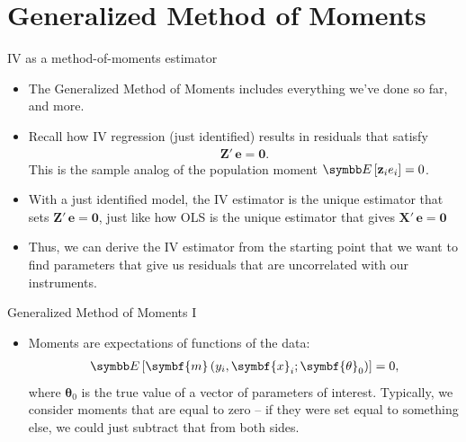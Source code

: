 \documentclass[aspectratio=169,11pt]{beamer}
\begin{document}
\section{Generalized Method of Moments}
	

\begin{frame}{IV as a method-of-moments estimator}
\begin{itemize}
	\item The Generalized Method of Moments includes everything we've
	done so far, and more.
	
	\item Recall how IV regression (just identified) results in residuals that satisfy
	\begin{align*}
		\symbf{Z}'\, \symbf{e}  = \symbf{0}.
	\end{align*}
	This is the sample analog of the population moment $\E\left[ {\bf z}_i e_i \right]=0$.
	
	\medskip
	\item With a just identified model, the IV estimator is the unique estimator that sets 
	$\symbf{Z'\, e} = \symbf{0} $, just like how OLS is the unique estimator that gives $\symbf{X'\, e} = \symbf{0} $
	
	\medskip
	\item Thus, we can derive the IV estimator from the starting point that we want to find
	parameters that give us residuals that are uncorrelated with our instruments. 

\end{itemize}
\end{frame}	


\begin{frame}{Generalized Method of Moments I}
\begin{itemize}
	\item \alert{Moments} are expectations of functions of the data:
	\begin{align*}
		\E\left[ \symbf{m}\left(y_i,\symbf{x}_i;\symbf{\theta}_0\right) \right]=0,
	\end{align*}
	where $\symbf{\theta}_0$ is the true value of a vector of parameters of interest.
	Typically, we consider moments that are equal to zero -- if they were set equal to something else,
	we could just subtract that from both sides.
\end{itemize}
\end{frame}
\end{document}
